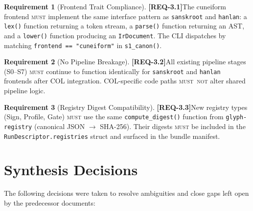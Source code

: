 \documentclass[11pt,a4paper,twoside]{article}
\theoremstyle{definition}
\newtheorem{requirement}{Requirement}[section]
\theoremstyle{remark}
\newcommand{\req}[1]{\textbf{\textcolor{reqred}{[REQ-#1]}}}
\newcommand{\must}{\textsc{must}}
\newcommand{\mustnot}{\textsc{must~not}}
\begin{document}
\begin{requirement}[Frontend Trait Compliance]
\label{req:frontend-trait}
\req{3.1}\quad The cuneiform frontend \must{} implement the same interface pattern as \texttt{sanskroot} and \texttt{hanlan}: a \texttt{lex()} function returning a token stream, a \texttt{parse()} function returning an AST, and a \texttt{lower()} function producing an \texttt{IrDocument}. The CLI dispatches by matching \texttt{frontend == "cuneiform"} in \texttt{s1\_canon()}.
\end{requirement}

\begin{requirement}[No Pipeline Breakage]
\label{req:no-breakage}
\req{3.2}\quad All existing pipeline stages (S0--S7) \must{} continue to function identically for \texttt{sanskroot} and \texttt{hanlan} frontends after COL integration. COL-specific code paths \mustnot{} alter shared pipeline logic.
\end{requirement}

\begin{requirement}[Registry Digest Compatibility]
\label{req:registry-compat}
\req{3.3}\quad New registry types (Sign, Profile, Gate) \must{} use the same \texttt{compute\_digest()} function from \texttt{glyph-registry} (canonical JSON $\to$ SHA-256). Their digests \must{} be included in the \texttt{RunDescriptor.registries} struct and surfaced in the bundle manifest.
\end{requirement}



\section{Synthesis Decisions}
\label{sec:synthesis}

The following decisions were taken to resolve ambiguities and close gaps left open by the predecessor documents:
\end{document}
